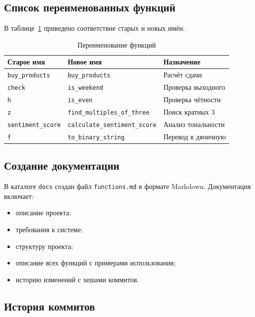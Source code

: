 \documentclass[a4paper,12pt]{article}
\begin{document}
\subsection{Список переименованных функций}

В таблице~\ref{tab:rename} приведено соответствие старых и новых имён.

\begin{table}[h]
\centering
\begin{tabular}{|l|l|l|}
\hline
\textbf{Старое имя} & \textbf{Новое имя} & \textbf{Назначение} \\
\hline
\texttt{buy\_products} & \texttt{buy\_products} & Расчёт сдачи \\
\texttt{check} & \texttt{is\_weekend} & Проверка выходного \\
\texttt{h} & \texttt{is\_even} & Проверка чётности \\
\texttt{z} & \texttt{find\_multiples\_of\_three} & Поиск кратных 3 \\
\texttt{sentiment\_score} & \texttt{calculate\_sentiment\_score} & Анализ тональности \\
\texttt{f} & \texttt{to\_binary\_string} & Перевод в двоичную \\
\hline
\end{tabular}
\caption{Переименование функций}
\label{tab:rename}
\end{table}

\subsection{Создание документации}

В каталоге \texttt{docs} создан файл \texttt{functions.md} в формате
Markdown. Документация включает:

\begin{itemize}
    \item описание проекта;
    \item требования к системе;
    \item структуру проекта;
    \item описание всех функций с примерами использования;
    \item историю изменений с хешами коммитов.
\end{itemize}

\subsection{История коммитов}
\end{document}
